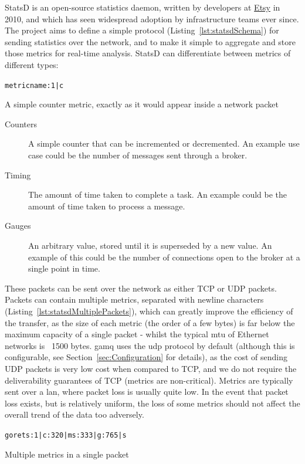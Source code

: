 StatsD is an open-source statistics daemon, written by developers at
\href{https://www.etsy.com/uk/}{Etsy} in 2010\cite{statsd}, and which has seen
widespread adoption by infrastructure teams ever since. The project aims to
define a simple protocol (Listing~\ref{lst:statsdSchema}) for sending statistics
over the network, and to make it simple to aggregate and store those metrics for
real-time analysis. StatsD can differentiate between metrics of different types:

\begin{listing}
  \centering
  \texttt{metricname:1|c}
  \caption{A simple counter metric, exactly as it would appear inside a network packet}
  \label{lst:statsdSchema}
\end{listing}

\begin{description}
  \item[Counters] A simple counter that can be incremented or decremented. An
  example use case could be the number of messages sent through a broker.
  \item[Timing] The amount of time taken to complete a task. An example could be
  the amount of time taken to process a message.
  \item[Gauges] An arbitrary value, stored until it is superseded by a new
  value. An example of this could be the number of connections open to the
  broker at a single point in time.
\end{description}

These packets can be sent over the network as either TCP or UDP packets. Packets
can contain multiple metrics, separated with newline characters
(Listing~\ref{lst:statsdMultiplePackets}), which can greatly improve the
efficiency of the transfer, as the size of each metric (the order of a few
bytes) is far below the maximum capacity of a single packet - whilst the typical
\gls{mtu} of Ethernet networks is ~1500 bytes\cite{rfc1191}. \gls{gamq} uses the
\gls{udp} protocol by default (although this is configurable, see
Section~\ref{sec:Configuration} for details), as the cost of sending UDP packets
is very low cost when compared to TCP, and we do not require the deliverability
guarantees of TCP (metrics are non-critical). Metrics are typically sent over a
\gls{lan}, where packet loss is usually quite low. In the event that packet loss
exists, but is relatively uniform, the loss of some metrics should not affect
the overall trend of the data too adversely.

\begin{listing}
  \centering
  \texttt{gorets:1|c\nglork:320|ms\ngaugor:333|g\nuniques:765|s}
  \caption{Multiple metrics in a single packet}
  \label{lst:statsdMultiplePackets}
\end{listing}

